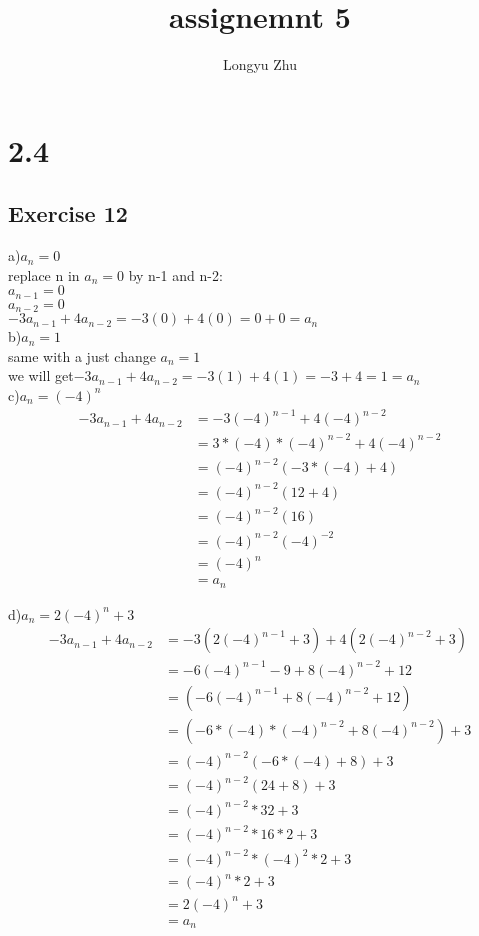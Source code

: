 \documentclass[12pt]{article}
\title{assignemnt 5}
\author{Longyu Zhu}
\begin{document}
\section*{2.4}
\subsection*{Exercise 12}
a)$a_{n}=0$\\
replace n in $a_n=0$ by n-1 and n-2:\\
$a_{n-1}=0$\\
$a_{n-2}=0$\\
$-3a_{n-1}+4a_{n-2}=-3(0)+4(0)=0+0=a_n$\\

b)$a_{n}=1$\\
same with a just change $a_{n}=1$\\
we will get$-3a_{n-1}+4a_{n-2}=-3(1)+4(1)=-3+4=1=a_n$\\

c)$a_{n}=(-4)^n$\\
\begin{equation}\nonumber
    \begin{split}
        -3a_{n-1}+4a_{n-2} & =-3(-4)^{n-1}+4(-4)^{n-2}\\
          & =3*(-4)*(-4)^{n-2}+4(-4)^{n-2}\\
          & =(-4)^{n-2}(-3*(-4)+4)\\
          & =(-4)^{n-2}(12+4)\\
          & =(-4)^{n-2}(16)\\
          & =(-4)^{n-2}(-4)^{-2}\\
          & =(-4)^n\\
          & =a_{n}
    \end{split}
\end{equation}

d)$a_{n}=2(-4)^n+3$\\
\begin{equation}\nonumber
    \begin{split}
        -3a_{n-1}+4a_{n-2} &=-3(2(-4)^{n-1}+3)+4(2(-4)^{n-2}+3)\\
        &=-6(-4)^{n-1}-9+8(-4)^{n-2}+12\\
        &=(-6(-4)^{n-1}+8(-4)^{n-2}+12)\\
        &=(-6*(-4)*(-4)^{n-2}+8(-4)^{n-2})+3\\
        &=(-4)^{n-2}(-6*(-4)+8)+3\\
        &=(-4)^{n-2}(24+8)+3\\
        &=(-4)^{n-2}*32+3\\
        &=(-4)^{n-2}*16*2+3\\
        &=(-4)^{n-2}*(-4)^2*2+3\\
        &=(-4)^{n}*2+3\\
        &=2(-4)^n+3\\
        &=a_n
    \end{split}
\end{equation}
\end{document}
